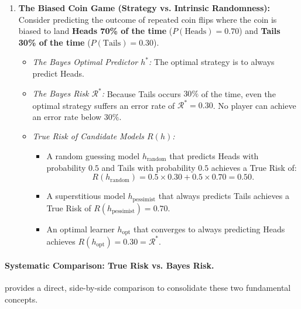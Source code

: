 \begin{example}
\begin{enumerate}[leftmargin=*]
  \item \textbf{The Biased Coin Game (Strategy vs. Intrinsic Randomness):}  
  Consider predicting the outcome of repeated coin flips where the coin is biased to land \textbf{Heads 70\% of the time} ($P(\text{Heads}) = 0.70$) and \textbf{Tails 30\% of the time} ($P(\text{Tails}) = 0.30$).
  \begin{itemize}[noitemsep]
    \item \emph{The Bayes Optimal Predictor $h^*$:} The optimal strategy is to always predict Heads.
    \item \emph{The Bayes Risk $\mathcal{R}^*$:} Because Tails occurs $30\%$ of the time, even the optimal strategy suffers an error rate of $\mathcal{R}^* = 0.30$. No player can achieve an error rate below $30\%$.
    \item \emph{True Risk of Candidate Models $R(h)$:} 
    \begin{itemize}
      \item A random guessing model $h_{\text{random}}$ that predicts Heads with probability $0.5$ and Tails with probability $0.5$ achieves a True Risk of:
      \begin{equation*}
      R(h_{\text{random}}) = 0.5 \times 0.30 + 0.5 \times 0.70 = 0.50.
      \end{equation*}
      \item A superstitious model $h_{\text{pessimist}}$ that always predicts Tails achieves a True Risk of $R(h_{\text{pessimist}}) = 0.70$.
      \item An optimal learner $h_{\text{opt}}$ that converges to always predicting Heads achieves $R(h_{\text{opt}}) = 0.30 = \mathcal{R}^*$.
    \end{itemize}
  \end{itemize}
\end{enumerate}
\end{example}

\paragraph{Systematic Comparison: True Risk vs. Bayes Risk.}
 provides a direct, side-by-side comparison to consolidate these two fundamental concepts.

